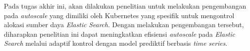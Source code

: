 Pada tugas akhir ini, akan dilakukan penelitian untuk melakukan pengembangan pada \textit{autoscale} yang dimiliki oleh Kubernetes yang spesifik untuk mengontrol alokasi sumber daya \textit{Elastic Search}. Dengan melakukan pengembangan tersebut, diharapkan penelitian ini dapat meningkatkan efisiensi \textit{autoscale} pada \textit{Elastic Search} melalui adaptif kontrol dengan model prediktif berbasis \textit{time series}.


